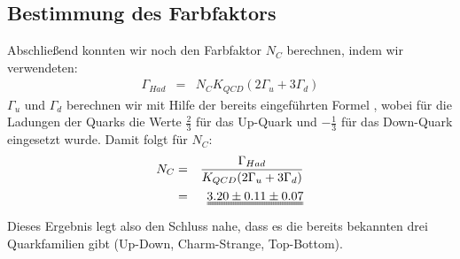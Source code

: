 \subsection{Bestimmung des Farbfaktors}
Abschließend konnten wir noch den Farbfaktor $N_C$ berechnen, indem wir \cite[Gl.15]{script} verwendeten:
\begin{eqnarray}
\Gamma_{Had} &=& N_CK_{QCD}(2\Gamma_u + 3\Gamma_d)
\end{eqnarray}
$\Gamma_u$ und $\Gamma_d$ berechnen wir mit Hilfe der bereits eingeführten Formel \cite[Gl.6]{script}, wobei für die Ladungen der Quarks die Werte $\frac{2}{3}$ für das Up-Quark und $-\frac{1}{3}$ für das Down-Quark eingesetzt wurde. Damit folgt für $N_C$:
\begin{eqnarray}
N_C &=& \frac{\Gamma_{Had}}{K_{QCD}(2\Gamma_u + 3\Gamma_d)}\\
\nonumber &=& \uuline{3.20 \pm 0.11 \pm 0.07}
\end{eqnarray}
Dieses Ergebnis legt also den Schluss nahe, dass es die bereits bekannten drei Quarkfamilien gibt (Up-Down, Charm-Strange, Top-Bottom).